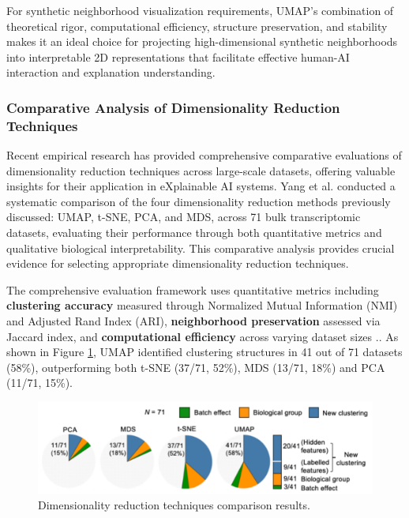 For 
synthetic
neighborhood visualization requirements, UMAP's combination of theoretical rigor, computational efficiency, structure preservation, and stability makes it an ideal choice for projecting high-dimensional synthetic neighborhoods into interpretable 2D representations that facilitate effective human-AI interaction and explanation understanding.

\subsubsection{Comparative Analysis of Dimensionality Reduction Techniques}
Recent empirical research has provided comprehensive comparative evaluations of dimensionality reduction techniques across large-scale datasets, offering valuable insights for their application in eXplainable AI systems. Yang et al.\cite{yang2021dimensionality} conducted a systematic comparison of the four dimensionality reduction methods previously discussed: UMAP, t-SNE, PCA, and MDS, across 71 bulk transcriptomic datasets, evaluating their performance through both quantitative metrics and qualitative biological interpretability. This comparative analysis provides crucial evidence for selecting appropriate dimensionality reduction techniques.

The comprehensive evaluation framework uses quantitative metrics including \textbf{clustering accuracy} measured through Normalized Mutual Information (NMI) and Adjusted Rand Index (ARI), \textbf{neighborhood preservation} assessed via Jaccard index, and \textbf{computational efficiency} across varying dataset sizes \cite{yang2021dimensionality}.. 
As shown in Figure \ref{fig:DRcomparison1}, UMAP identified clustering structures in 41 out of 71 datasets (58\%), outperforming both t-SNE (37/71, 52\%), MDS (13/71, 18\%) and PCA (11/71, 15\%).

\begin{figure}
    \centering
    \includegraphics[width=\linewidth]{images/DRcomparison1.png}
    \caption{Dimensionality reduction techniques comparison results.}
    \label{fig:DRcomparison1}
\end{figure}

